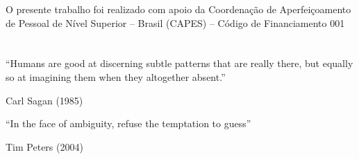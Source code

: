 O presente trabalho foi realizado com apoio da Coordenação de Aperfeiçoamento de Pessoal de Nível Superior – Brasil (CAPES) – Código de Financiamento 001


\newpage
\section*{}
\vspace{16cm}


 
\setlength{\epigraphrule}{0pt}
\epigraph{
``Humans are good at discerning subtle patterns that are really there, but equally so at imagining them when they altogether absent.''}{Carl Sagan (1985)}

\setlength{\epigraphrule}{0pt}
\epigraph{
``In the face of ambiguity, refuse the temptation to guess''}{Tim Peters (2004)}



